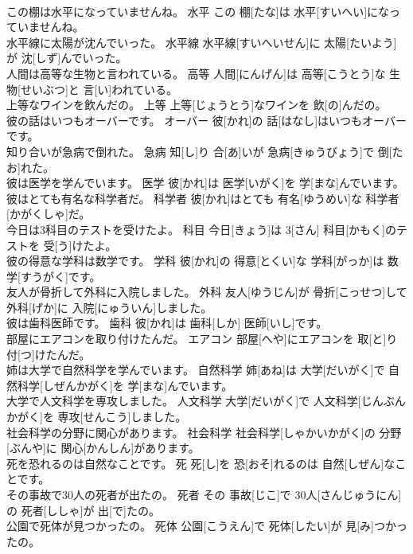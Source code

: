 \documentclass[8pt]{extreport}
\begin{document}
\begin{CJK}{UTF8}{min}
\\	この棚は水平になっていませんね。	水平	この 棚[たな]は 水平[すいへい]になっていませんね。	
\\	水平線に太陽が沈んでいった。	水平線	水平線[すいへいせん]に 太陽[たいよう]が 沈[しず]んでいった。	
\\	人間は高等な生物と言われている。	高等	人間[にんげん]は 高等[こうとう]な 生物[せいぶつ]と 言[い]われている。	
\\	上等なワインを飲んだの。	上等	上等[じょうとう]なワインを 飲[の]んだの。	
\\	彼の話はいつもオーバーです。	オーバー	彼[かれ]の 話[はなし]はいつもオーバーです。	
\\	知り合いが急病で倒れた。	急病	知[し]り 合[あ]いが 急病[きゅうびょう]で 倒[たお]れた。	
\\	彼は医学を学んでいます。	医学	彼[かれ]は 医学[いがく]を 学[まな]んでいます。	
\\	彼はとても有名な科学者だ。	科学者	彼[かれ]はとても 有名[ゆうめい]な 科学者[かがくしゃ]だ。	
\\	今日は3科目のテストを受けたよ。	科目	今日[きょう]は 3[さん] 科目[かもく]のテストを 受[う]けたよ。	
\\	彼の得意な学科は数学です。	学科	彼[かれ]の 得意[とくい]な 学科[がっか]は 数学[すうがく]です。	
\\	友人が骨折して外科に入院しました。	外科	友人[ゆうじん]が 骨折[こっせつ]して 外科[げか]に 入院[にゅういん]しました。	
\\	彼は歯科医師です。	歯科	彼[かれ]は 歯科[しか] 医師[いし]です。	
\\	部屋にエアコンを取り付けたんだ。	エアコン	部屋[へや]にエアコンを 取[と]り 付[つ]けたんだ。	
\\	姉は大学で自然科学を学んでいます。	自然科学	姉[あね]は 大学[だいがく]で 自然科学[しぜんかがく]を 学[まな]んでいます。	
\\	大学で人文科学を専攻しました。	人文科学	大学[だいがく]で 人文科学[じんぶんかがく]を 専攻[せんこう]しました。	
\\	社会科学の分野に関心があります。	社会科学	社会科学[しゃかいかがく]の 分野[ぶんや]に 関心[かんしん]があります。	
\\	死を恐れるのは自然なことです。	死	死[し]を 恐[おそ]れるのは 自然[しぜん]なことです。	
\\	その事故で30人の死者が出たの。	死者	その 事故[じこ]で 30人[さんじゅうにん]の 死者[ししゃ]が 出[で]たの。	
\\	公園で死体が見つかったの。	死体	公園[こうえん]で 死体[したい]が 見[み]つかったの。	

\end{CJK}
\end{document}
